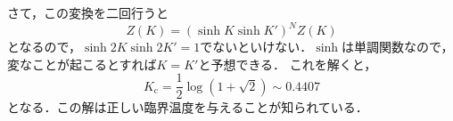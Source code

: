 	さて，この変換を二回行うと
	\begin{equation}
			Z(K) = (\sinh K \sinh K')^NZ(K)
	\end{equation}
	となるので，$\sinh 2K \sinh 2K' = 1$でないといけない．$\sinh$は単調関数なので，変なことが起こるとすれば$K = K'$と予想できる．
	これを解くと，
	\begin{equation}
			K_{\text{c}} = \frac{1}{2}\log(1 + \sqrt{2}) \sim 0.4407 \label{Tc_2d-Ising}
	\end{equation}
	となる．この解は正しい臨界温度を与えることが知られている．



